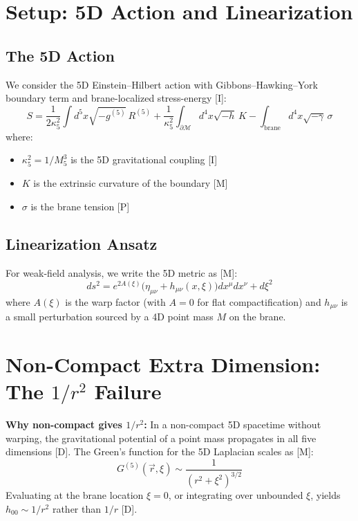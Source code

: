 \documentclass[11pt,a4paper]{article}
\newcommand{\Mfive}{M_5}
\newcommand{\kfive}{\kappa_5}
\begin{document}
\section{Setup: 5D Action and Linearization}
\label{sec:setup}

\subsection{The 5D Action}

We consider the 5D Einstein--Hilbert action with Gibbons--Hawking--York
boundary term and brane-localized stress-energy [I]:
\begin{equation}
\label{eq:5D-action}
S = \frac{1}{2\kfive^2} \int d^5x \sqrt{-g^{(5)}} \, R^{(5)}
    + \frac{1}{\kfive^2} \int_{\partial\mathcal{M}} d^4x \sqrt{-h} \, K
    - \int_{\text{brane}} d^4x \sqrt{-\gamma} \, \sigma
\end{equation}
where:
\begin{itemize}
    \item $\kfive^2 = 1/\Mfive^3$ is the 5D gravitational coupling [I]
    \item $K$ is the extrinsic curvature of the boundary [M]
    \item $\sigma$ is the brane tension [P]
\end{itemize}

\subsection{Linearization Ansatz}

For weak-field analysis, we write the 5D metric as [M]:
\begin{equation}
\label{eq:linearization}
ds^2 = e^{2A(\xi)} \bigl( \eta_{\mu\nu} + h_{\mu\nu}(x,\xi) \bigr) dx^\mu dx^\nu + d\xi^2
\end{equation}
where $A(\xi)$ is the warp factor (with $A=0$ for flat compactification) and
$h_{\mu\nu}$ is a small perturbation sourced by a 4D point mass $M$ on the brane.

\section{Non-Compact Extra Dimension: The $1/r^2$ Failure}
\label{sec:noncompact}

\textbf{Why non-compact gives $1/r^2$:} In a non-compact 5D spacetime without
warping, the gravitational potential of a point mass propagates in all five
dimensions [D]. The Green's function for the 5D Laplacian scales as [M]:
\begin{equation}
G^{(5)}(\vec{r}, \xi) \sim \frac{1}{(r^2 + \xi^2)^{3/2}}
\end{equation}
Evaluating at the brane location $\xi = 0$, or integrating over unbounded $\xi$,
yields $h_{00} \sim 1/r^2$ rather than $1/r$ [D].
\end{document}
